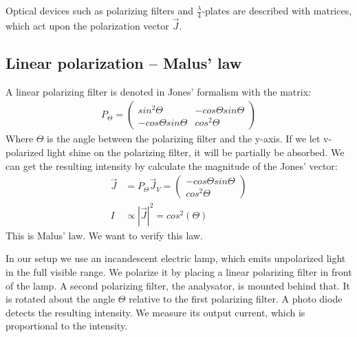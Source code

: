 \documentclass[a4paper,10pt,twocolumn]{article}
\newcommand{\quaterWavePlates}{$\frac{\lambda}{4}$-plates }
\begin{document}
    Optical devices such as polarizing filters and \quaterWavePlates are described with matrices, which act
    upon the polarization vector $\vec{J}$. 
    
    \subsection{Linear polarization -- Malus' law}
    
    
    A linear polarizing filter is denoted in Jones' formalism with the matrix:
    \begin{align*}
        P_{\Theta} = \begin{pmatrix} sin^2\Theta & - cos\Theta sin\Theta \\
                        - cos\Theta sin\Theta & cos^2\Theta \end{pmatrix}
    \end{align*}
    Where $\Theta$ is the angle between the polarizing filter and the y-axis.
    If we let v-polarized light shine on the polarizing filter, it will be partially be absorbed.
    We can get the resulting intensity by calculate the magnitude of the Jones' vector:
    \begin{align}
        \label{eq:theoMaluslaw}
        \vec{J} &= P_{\Theta} \vec{J}_V = \begin{pmatrix} -cos\Theta sin\Theta \\
                                               cos^2\Theta\end{pmatrix} \\
        I &\propto | \vec{J} |^2 = cos^2(\Theta) 
    \end{align}
    This is Malus' law.
    We want to verify this law.
    
    In our setup we use an incandescent electric lamp, which emits unpolarized light in the full
    visible range.
    We polarize it by placing a linear polarizing filter in front of the lamp.
    A second polarizing filter, the analysator, is mounted behind that.
    It is rotated about the angle $\Theta$ relative to the first polarizing filter.
    A photo diode detects the resulting intensity.
    We measure its output current, which is proportional to the intensity.
    
\end{document}
